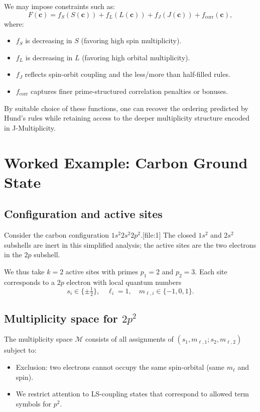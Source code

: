 \documentclass[11pt]{article}
\begin{document}
We may impose constraints such as:
\[
F(\mathbf{c}) = f_S(S(\mathbf{c})) + f_L(L(\mathbf{c})) + f_J(J(\mathbf{c})) + f_{\text{corr}}(\mathbf{c}),
\]
where:
\begin{itemize}
  \item \(f_S\) is decreasing in \(S\) (favoring high spin multiplicity).
  \item \(f_L\) is decreasing in \(L\) (favoring high orbital multiplicity).
  \item \(f_J\) reflects spin-orbit coupling and the less/more than half-filled rules.
  \item \(f_{\text{corr}}\) captures finer prime-structured correlation penalties or bonuses.
\end{itemize}

By suitable choice of these functions, one can recover the ordering predicted by Hund's rules while retaining access to the deeper multiplicity structure encoded in J-Multiplicity.

\section{Worked Example: Carbon Ground State}

\subsection{Configuration and active sites}

Consider the carbon configuration \(1s^2 2s^2 2p^2\).[file:1] The closed \(1s^2\) and \(2s^2\) subshells are inert in this simplified analysis; the active sites are the two electrons in the \(2p\) subshell.

We thus take \(k=2\) active sites with primes \(p_1=2\) and \(p_2=3\). Each site corresponds to a \(2p\) electron with local quantum numbers
\[
s_i \in \{\pm \tfrac{1}{2}\}, \quad \ell_i = 1, \quad m_{\ell,i} \in \{-1,0,1\}.
\]

\subsection{Multiplicity space for \(2p^2\)}

The multiplicity space \(\mathcal{M}\) consists of all assignments of \((s_1, m_{\ell,1}; s_2, m_{\ell,2})\) subject to:
\begin{itemize}
  \item Exclusion: two electrons cannot occupy the same spin-orbital (same \(m_{\ell}\) and spin).
  \item We restrict attention to LS-coupling states that correspond to allowed term symbols for \(p^2\).
\end{itemize}
\end{document}
